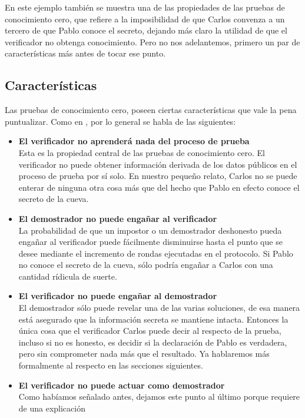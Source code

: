 \documentclass[oneside,10pt]{article}
\begin{document}
En este ejemplo también se muestra una de las propiedades de las pruebas de conocimiento cero, que
refiere a la imposibilidad de que Carlos convenza a un tercero de que Pablo conoce el secreto,
dejando más claro la utilidad de que el verificador no obtenga conocimiento. Pero no nos adelantemos, primero un par de características más antes de tocar
ese punto. 



\subsection{Características}
Las pruebas de conocimiento cero, poseen ciertas características que vale la pena puntualizar. Como
en \cite{simari}, por lo general se habla de las siguientes:
\begin{itemize}
\item\textbf{{El verificador no aprenderá nada del proceso de prueba}} \\
  Esta es la propiedad central de las pruebas de conocimiento cero. El verificador no puede obtener
  información derivada de los datos públicos en el proceso de prueba por sí solo.
  En nuestro pequeño relato, Carlos no se puede enterar de ninguna otra cosa más que del hecho que Pablo
  en efecto conoce el secreto de la cueva.
\item\textbf{{El demostrador no puede engañar al verificador}}\\
  La probabilidad de que un impostor o un demostrador deshonesto pueda engañar al verificador puede fácilmente disminuirse hasta el punto que se desee mediante el incremento
  de rondas ejecutadas en el protocolo. Si Pablo no conoce el secreto de la cueva, sólo podría engañar a Carlos con una cantidad rídicula de suerte. 
\item\textbf{{El verificador no puede engañar al demostrador}}\\
  El demostrador sólo puede revelar una de las varias soluciones, de esa manera está asegurado que
  la información secreta se mantiene intacta. Entonces la única cosa que el verificador Carlos puede decir al respecto de la prueba, incluso si no es honesto, es decidir si la declaración de Pablo es verdadera, pero sin comprometer nada más que el resultado. Ya hablaremos más formalmente al respecto en las secciones siguientes. 
\item\textbf{{El verificador no puede actuar como demostrador}}\\
  Como habíamos señalado antes, dejamos este punto al último porque requiere de una explicación

\end{itemize}
\end{document}
